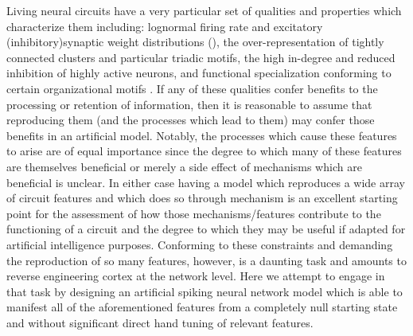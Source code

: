\documentclass[10pt,letterpaper]{article}
\begin{document}
 Living neural circuits have a very particular set of qualities and properties which characterize them including: lognormal firing rate \cite{hromadka2008sparse, mizuseki2013preconfigured, buzsaki2014log, nigam2016} and excitatory (inhibitory)synaptic weight distributions \cite{song2005highly, lefort2009excitatory, feldmeyer2002synaptic} (\cite{borst1994large, brussaard1997plasticity, nusser1997differences}), the over-representation of tightly connected clusters\cite{perin2011synaptic} and particular triadic motifs\cite{song2005highly},  the high in-degree and reduced inhibition of highly active neurons\cite{yassin2010embedded}\cite{benedetti2012differential}, and functional specialization conforming to certain organizational motifs \cite{harris2015neocortical}. If any of these qualities confer benefits to the processing or retention of information, then it is reasonable to assume that reproducing them (and the processes which lead to them) may confer those benefits in an artificial model. Notably, the processes which cause these features to arise are of equal importance since the degree to which many of these features are themselves beneficial or merely a side effect of mechanisms which are beneficial is unclear. In either case having a model which reproduces a wide array of circuit features and which does so through mechanism is an excellent starting point for the assessment of how those mechanisms/features contribute to the functioning of a circuit and the degree to which they may be useful if adapted for artificial intelligence purposes. Conforming to these constraints and demanding the reproduction of so many features, however, is a daunting task and amounts to reverse engineering cortex at the network level. Here we attempt to engage in that task by designing an artificial spiking neural network model which is able to manifest all of the aforementioned features from a completely null starting state and without significant direct hand tuning of relevant features. 
\end{document}
